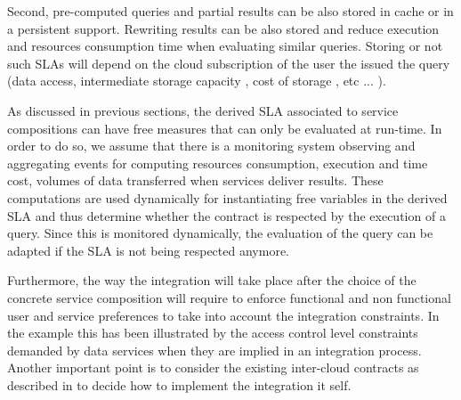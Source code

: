 Second, pre-computed queries and partial results can be also stored in cache or in a persistent support. Rewriting results can be also stored and reduce execution and resources consumption time when evaluating similar queries. Storing or not such SLAs will depend on the cloud subscription of the user the issued the query (data access, intermediate storage capacity , cost of storage , etc ... ).

As discussed in previous sections, the derived SLA associated to service compositions can have free measures that can only be evaluated at run-time. In order to do so, we assume that there is a monitoring system observing and aggregating events for computing resources consumption, execution and time cost, volumes of data transferred when services deliver results. These computations are used dynamically for instantiating free variables in the derived SLA and thus determine whether the contract is respected by the execution of a query. Since this is monitored dynamically, the evaluation of the query can be adapted if the SLA is not being respected anymore.

 Furthermore, the way the integration will take place after the choice of the concrete service composition will require to enforce functional and non functional user and service preferences to take into account the integration constraints. In the example this has been illustrated by  the access control level constraints demanded by data services when they are implied in an integration process. Another important point is to consider the existing inter-cloud contracts as described in \cite{} to decide how to implement the integration it self.


